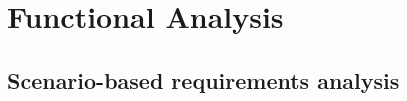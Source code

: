 
\chapter{Functional Analysis} %

\label{Chapter3} %


\section{Scenario-based requirements analysis}

